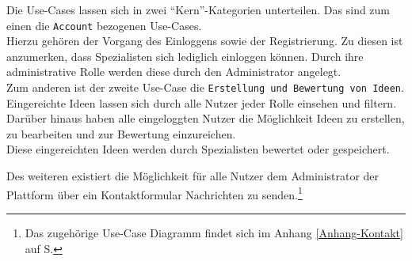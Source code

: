 Die Use-Cases lassen sich in zwei \enquote{Kern}-Kategorien unterteilen.
Das sind zum einen die \texttt{Account} bezogenen Use-Cases.\\
Hierzu gehören der Vorgang des Einloggens sowie der Registrierung.
Zu diesen ist anzumerken, dass Spezialisten sich lediglich einloggen können.
Durch ihre administrative Rolle werden diese durch den Administrator angelegt.\\
Zum anderen ist der zweite Use-Case die \texttt{Erstellung und Bewertung von Ideen}.\\
Eingereichte Ideen lassen sich durch alle Nutzer jeder Rolle einsehen und filtern. Darüber hinaus haben alle eingeloggten Nutzer die Möglichkeit Ideen zu erstellen, zu bearbeiten und zur Bewertung einzureichen.\\
Diese eingereichten Ideen werden durch Spezialisten bewertet oder gespeichert.

Des weiteren existiert die Möglichkeit für alle Nutzer dem Administrator der Plattform über ein Kontaktformular Nachrichten zu senden.\footnote{Das zugehörige Use-Case Diagramm findet sich im Anhang \ref{Anhang-Kontakt} auf S.\pageref{Anhang-Kontakt}}